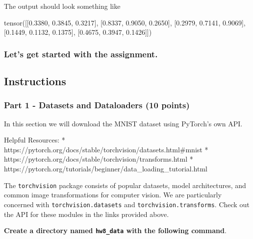 \documentclass[11pt]{article}
\newenvironment{Shaded}{}{}
\newcommand{\FloatTok}[1]{\textcolor[rgb]{0.25,0.63,0.44}{{#1}}}
\newcommand{\NormalTok}[1]{{#1}}
\begin{document}
    The output should look something like

\begin{Shaded}
\begin{Highlighting}[]
\NormalTok{tensor([[}\FloatTok{0.3380}\NormalTok{, }\FloatTok{0.3845}\NormalTok{, }\FloatTok{0.3217}\NormalTok{],}
\NormalTok{        [}\FloatTok{0.8337}\NormalTok{, }\FloatTok{0.9050}\NormalTok{, }\FloatTok{0.2650}\NormalTok{],}
\NormalTok{        [}\FloatTok{0.2979}\NormalTok{, }\FloatTok{0.7141}\NormalTok{, }\FloatTok{0.9069}\NormalTok{],}
\NormalTok{        [}\FloatTok{0.1449}\NormalTok{, }\FloatTok{0.1132}\NormalTok{, }\FloatTok{0.1375}\NormalTok{],}
\NormalTok{        [}\FloatTok{0.4675}\NormalTok{, }\FloatTok{0.3947}\NormalTok{, }\FloatTok{0.1426}\NormalTok{]])}
\end{Highlighting}
\end{Shaded}

\subsubsection{Let's get started with the
assignment.}\label{lets-get-started-with-the-assignment.}

    \subsection{Instructions}\label{instructions}

\subsubsection{Part 1 - Datasets and Dataloaders (10
points)}\label{part-1---datasets-and-dataloaders-10-points}

In this section we will download the MNIST dataset using PyTorch's own
API.

Helpful Resources: *
https://pytorch.org/docs/stable/torchvision/datasets.html\#mnist *
https://pytorch.org/docs/stable/torchvision/transforms.html *
https://pytorch.org/tutorials/beginner/data\_loading\_tutorial.html

The \texttt{torchvision} package consists of popular datasets, model
architectures, and common image transformations for computer vision. We
are particularly concerned with \texttt{torchvision.datasets} and
\texttt{torchvision.transforms}. Check out the API for these modules in
the links provided above.

\textbf{Create a directory named \texttt{hw8\_data} with the following
command}.
\end{document}
